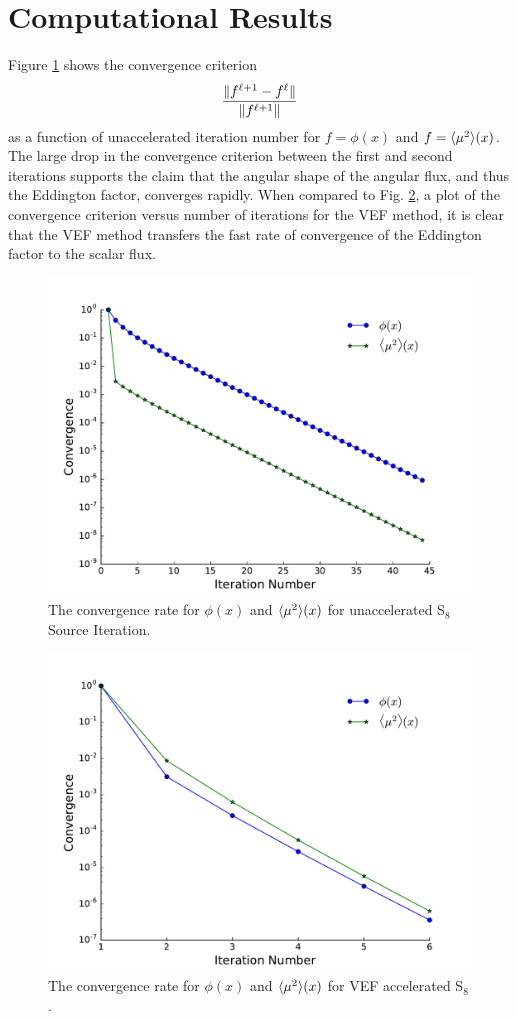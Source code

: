
\section{Computational Results}

Figure \ref{fig:si} shows the convergence criterion
	\begin{equation}
		\frac{\| f^{\ell+1} - f^\ell \|}{\| f^{\ell+1} \|} 
	\end{equation}
as a function of unaccelerated iteration number for $f = \phi(x)$ and $f = \langle \mu^2 \rangle(x)$. The large drop in the convergence criterion between the first and second iterations supports the claim that the angular shape of the angular flux, and thus the Eddington factor, converges rapidly. When compared to Fig. \ref{fig:vef}, a plot of the convergence criterion versus number of iterations for the VEF method, it is clear that the VEF method transfers the fast rate of convergence of the Eddington factor to the scalar flux. 

	\begin{figure}
		\centering
		\includegraphics[width=.75\textwidth]{figs/si.pdf}
		\caption{The convergence rate for $\phi(x)$ and $\langle \mu^2 \rangle(x)$ for unaccelerated S$_8$ Source Iteration. }
		\label{fig:si}
	\end{figure}

	\begin{figure}
		\centering
		\includegraphics[width=.75\textwidth]{figs/vef.pdf} 
		\caption{The convergence rate for $\phi(x)$ and $\langle \mu^2 \rangle(x)$ for VEF accelerated S$_8$. }
		\label{fig:vef}
	\end{figure}

